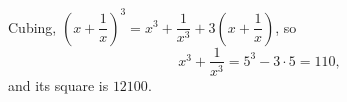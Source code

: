 Cubing, $\left(x+\dfrac{1}{x}\right)^3=x^3+\dfrac{1}{x^3}+3\left(x+\dfrac{1}{x}\right)$, so
\[
x^3+\dfrac{1}{x^3}=5^3-3\cdot5=110,
\]
and its square is $\boxed{12100}$.
